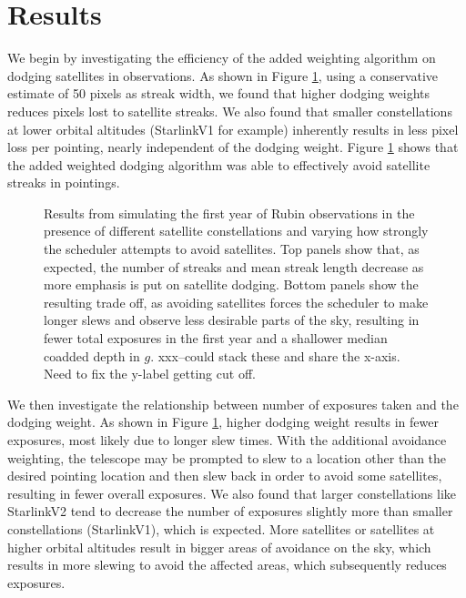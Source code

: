 \documentclass[linenumbers]{aastex631}
\begin{document}
\section{Results}
We begin by investigating the efficiency of the added weighting algorithm on dodging satellites in observations. As shown in Figure \ref{fig-pixel-loss-weight}, using a conservative estimate of 50 pixels as streak width, we found that higher dodging weights reduces pixels lost to satellite streaks. We also found that smaller constellations at lower orbital altitudes (StarlinkV1 for example) inherently results in less pixel loss per pointing, nearly independent of the dodging weight. Figure \ref{fig-pixel-loss-weight} shows that the added weighted dodging algorithm was able to effectively avoid satellite streaks in pointings.

\begin{figure}[ht!]
\caption{Results from simulating the first year of Rubin observations in the presence of different satellite constellations and varying how strongly the scheduler attempts to avoid satellites.  Top panels show that, as expected, the number of streaks and mean streak length decrease as more emphasis is put on satellite dodging. Bottom panels show the resulting trade off, as avoiding satellites forces the scheduler to make longer slews and observe less desirable parts of the sky, resulting in fewer total exposures in the first year and a shallower median coadded depth in $g$.
xxx--could stack these and share the x-axis. Need to fix the y-label getting cut off.
\label{fig-pixel-loss-weight}}
\end{figure}

We then investigate the relationship between number of exposures taken and the dodging weight. As shown in Figure \ref{fig-pixel-loss-weight}, higher dodging weight results in fewer exposures, most likely due to longer slew times. With the additional avoidance weighting, the telescope may be prompted to slew to a location other than the desired pointing location and then slew back in order to avoid some satellites, resulting in fewer overall exposures. We also found that larger constellations like StarlinkV2 tend to decrease the number of exposures slightly more than smaller constellations (StarlinkV1), which is expected. More satellites or satellites at higher orbital altitudes result in bigger areas of avoidance on the sky, which results in more slewing to avoid the affected areas, which subsequently reduces exposures. \\
\end{document}
